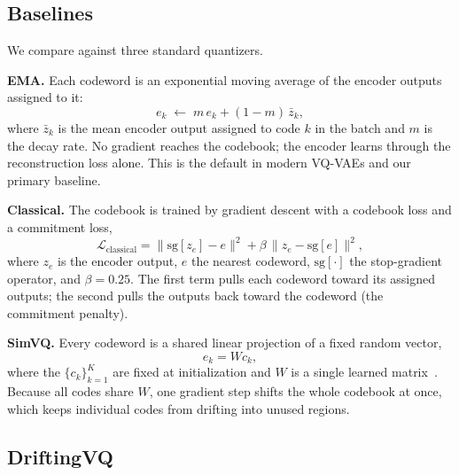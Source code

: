 \documentclass[10pt,twocolumn,letterpaper]{article}
\begin{document}
\subsection{Baselines}
\label{sec:baselines}

We compare against three standard quantizers.

\noindent\textbf{EMA.} Each codeword is an exponential moving average of the encoder
outputs assigned to it:
\begin{equation}
e_k \;\leftarrow\; m\,e_k + (1-m)\,\bar{z}_k,
\label{eq:ema}
\end{equation}
where $\bar{z}_k$ is the mean encoder output assigned to code $k$ in the batch and $m$
is the decay rate. No gradient reaches the codebook; the encoder learns through the
reconstruction loss alone. This is the default in modern VQ-VAEs and our primary
baseline.

\noindent\textbf{Classical.} The codebook is trained by gradient descent with a
codebook loss and a commitment loss,
\begin{equation}
\mathcal{L}_{\mathrm{classical}} = \|\mathrm{sg}[z_e] - e\|^2 + \beta\,\|z_e - \mathrm{sg}[e]\|^2,
\label{eq:classical}
\end{equation}
where $z_e$ is the encoder output, $e$ the nearest codeword, $\mathrm{sg}[\cdot]$ the
stop-gradient operator, and $\beta{=}0.25$. The first term pulls each codeword toward
its assigned outputs; the second pulls the outputs back toward the codeword (the
commitment penalty).

\noindent\textbf{SimVQ.} Every codeword is a shared linear projection of a fixed random
vector,
\begin{equation}
e_k = W c_k,
\label{eq:simvq}
\end{equation}
where the $\{c_k\}_{k=1}^K$ are fixed at initialization and $W$ is a single learned
matrix~\cite{simvq}. Because all codes share $W$, one gradient step shifts the whole
codebook at once, which keeps individual codes from drifting into unused regions.

\subsection{DriftingVQ}
\label{sec:driftingvq}
\end{document}
